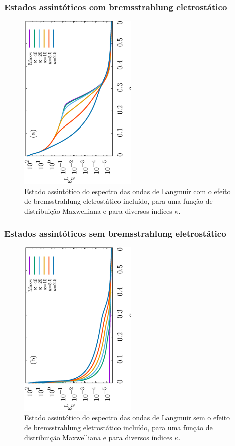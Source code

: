 \documentclass[10pt,aspectratio=1610,lualatex]{beamer}
\begin{document}
\begin{frame}
  \frametitle{Estados assintóticos com bremsstrahlung
  eletrostático}
  \begin{figure}
    \centering\includegraphics[width=0.5\textwidth,angle=270]{IL1D_005kvar}
    \caption*{Estado assintótico do espectro das ondas de Langmuir com o
      efeito de bremsstrahlung eletrostático incluído, para uma função de
      distribuição Maxwelliana e para diversos índices $\kappa$.}
  \end{figure}
\end{frame}


\begin{frame}
  \frametitle{Estados assintóticos sem bremsstrahlung
    eletrostático}
  \begin{figure}
    \centering\includegraphics[width=0.5\textwidth,angle=270]{IL1D_005kvarno-brem}
    \caption*{Estado assintótico do espectro das ondas de Langmuir sem o
      efeito de bremsstrahlung eletrostático incluído, para uma função de
      distribuição Maxwelliana e para diversos índices $\kappa$.}
  \end{figure}
\end{frame}
\end{document}
